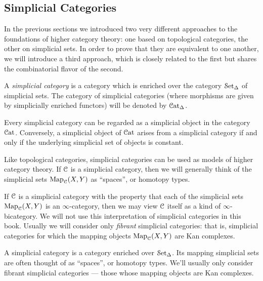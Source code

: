 \subsection{Simplicial Categories}\label{compp1}

In the previous sections we introduced two very different approaches to the foundations of higher category theory: one based on topological categories, the other on simplicial sets. In order to prove that they are equivalent to one another, we will introduce a third approach,  which is closely related to the first but shares the combinatorial flavor of the second.

\begin{definition}
A {\it simplicial category} is a category which is enriched over
the category $\operatorname{\mathcal{S}et_{\Delta}}$ of simplicial sets. The category of simplicial
categories (where morphisms are given by simplicially enriched functors) will be
denoted by $\operatorname{\mathcal{C}at_{\Delta}}$.
\end{definition}

\begin{remark}
Every simplicial category can be regarded as a simplicial object in the category $\operatorname{\mathcal{C}at}$. Conversely, a simplicial object of $\operatorname{\mathcal{C}at}$ arises from a simplicial category if and only if the underlying simplicial set of objects is constant.
\end{remark}

Like topological categories, simplicial categories can be used as models of higher category theory. If $\operatorname{\mathcal{C}}$ is a simplicial category, then we will generally think of the simplicial sets $\operatorname{{Map}}_{\operatorname{\mathcal{C}}}(X,Y)$ as ``spaces'', or homotopy types. 

\begin{remark}
If $\operatorname{\mathcal{C}}$ is a simplicial category with the property that each of the simplicial sets
$\operatorname{{Map}}_{\operatorname{\mathcal{C}}}(X,Y)$ is an $\infty$-category, then we may view $\operatorname{\mathcal{C}}$ itself as a kind of $\infty$-bicategory. We will not use this interpretation of simplicial categories in this book. Usually we will consider only {\em fibrant} simplicial categories: that is, simplicial categories for which the mapping objects $\operatorname{{Map}}_{\operatorname{\mathcal{C}}}(X,Y)$ are Kan complexes.
\end{remark}
\begin{shaded}
A simplicial category is a category enriched over $\operatorname{\mathcal{S}et_{\Delta}}$. Its mapping simplicial sets are often thought of as ``spaces'', or homotopy types. We'll usually only consider fibrant simplicial categories --- those whose mapping objects are Kan complexes.
\end{shaded}


